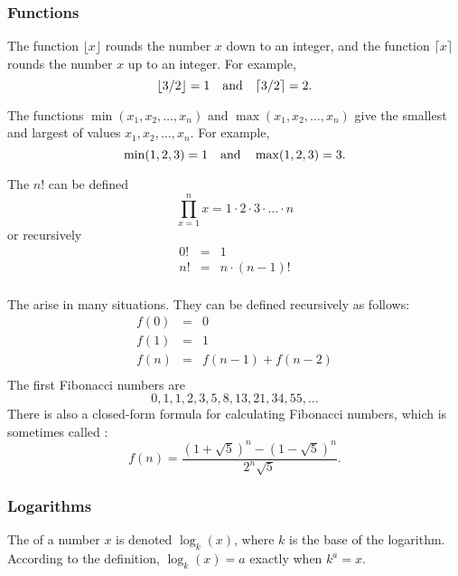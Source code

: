 \subsubsection{Functions}

The function $\lfloor x \rfloor$ rounds the number $x$
down to an integer, and the function
$\lceil x \rceil$ rounds the number $x$
up to an integer. For example,
\[ \lfloor 3/2 \rfloor = 1 \hspace{10px} \textrm{and} \hspace{10px} \lceil 3/2 \rceil = 2.\]

The functions $\min(x_1,x_2,\ldots,x_n)$
and $\max(x_1,x_2,\ldots,x_n)$
give the smallest and largest of values
$x_1,x_2,\ldots,x_n$.
For example,
\[ \min(1,2,3)=1 \hspace{10px} \textrm{and} \hspace{10px} \max(1,2,3)=3.\]


The  $n!$ can be defined
\[\prod_{x=1}^n x = 1 \cdot 2 \cdot 3 \cdot \ldots \cdot n\]
or recursively
\[
\begin{array}{lcl}
0! & = & 1 \\
n! & = & n \cdot (n-1)! \\
\end{array}
\]


The 
arise in many situations.
They can be defined recursively as follows:
\[
\begin{array}{lcl}
f(0) & = & 0 \\
f(1) & = & 1 \\
f(n) & = & f(n-1)+f(n-2) \\
\end{array}
\]
The first Fibonacci numbers are
\[0, 1, 1, 2, 3, 5, 8, 13, 21, 34, 55, \ldots\]
There is also a closed-form formula
for calculating Fibonacci numbers, which is sometimes called
 :
\[f(n)=\frac{(1 + \sqrt{5})^n - (1-\sqrt{5})^n}{2^n \sqrt{5}}.\]

\subsubsection{Logarithms}


The  of a number $x$
is denoted $\log_k(x)$, where $k$ is the base
of the logarithm.
According to the definition,
$\log_k(x)=a$ exactly when $k^a=x$.

